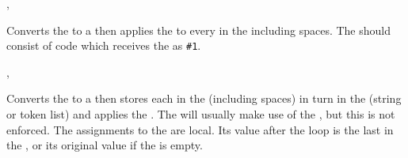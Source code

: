 \documentclass[oneside]{book}
\begin{document}
\begin{function}{\strMapInline,\strVarMapInline}
\begin{syntax}
  
  
\end{syntax}
Converts the  to a  then
applies the  to every  in the
 including spaces.
The  should consist of code which
receives the  as \verb|#1|.
\begin{demohigh}
\IgnoreSpacesOn
\strClear \lTmpaStr
{} {
  \strPutRight \lTmpaStr {[#1]}
}
\strUse \lTmpaStr
\IgnoreSpacesOff
\end{demohigh}
\end{function}


\begin{function}{\strMapVariable,\strMapVariable}
\begin{syntax}
   
   
\end{syntax}
Converts the  to a  then stores each
 in the  (including spaces) in turn in
the (string or token list)  and applies the
.  The  will usually make use of the
, but this is not enforced.  The assignments to the
 are local.  Its value after the loop is the last
 in the , or its original value if the
 is empty.
\begin{demohigh}
\IgnoreSpacesOn
\strClear \lTmpaStr
{} \lTmpiStr {
  \strPutRight \lTmpaStr {\expWhole {[\lTmpiStr]}}
}
\strUse \lTmpaStr
\IgnoreSpacesOff
\end{demohigh}
\end{function}
\end{document}
